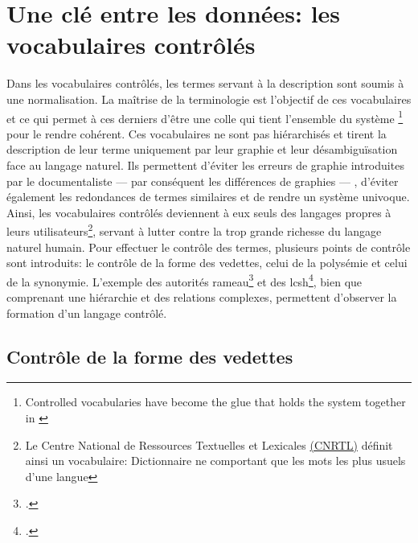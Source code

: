 \section{\label{I-A-2}Une clé entre les données: les vocabulaires contrôlés}

Dans les vocabulaires contrôlés, les termes servant à la description sont soumis à une normalisation. La maîtrise de la terminologie est l'objectif de ces vocabulaires et ce qui permet à ces derniers d'être une \og colle qui tient l'ensemble du système \footnote{\og Controlled vocabularies have become the glue that holds the system together \fg{} in \cite{rosenfeld_information_2015}}\fg{} pour le rendre cohérent. Ces vocabulaires ne sont pas hiérarchisés et tirent la description de leur terme uniquement par leur graphie et leur désambiguïsation face au langage naturel. Ils permettent d'éviter les erreurs de graphie introduites par le documentaliste --- par conséquent les différences de graphies --- , d'éviter également les redondances de termes similaires et de rendre un système univoque.
Ainsi, les vocabulaires contrôlés deviennent à eux seuls des langages propres à leurs utilisateurs\footnote{Le Centre National de Ressources Textuelles et Lexicales \href{https://www.cnrtl.fr/definition/vocabulaire}{(CNRTL)} définit ainsi un vocabulaire: \og Dictionnaire ne comportant que les mots les plus usuels d'une langue\fg{}}, servant à lutter contre la trop grande richesse du langage naturel humain.
Pour effectuer le contrôle des termes, plusieurs points de contrôle sont introduits: le contrôle de la forme des vedettes, celui de la polysémie et celui de la synonymie. L'exemple des autorités \ac{rameau}\footcite{bibliotheque_nationale_de_france_rameau_nodate} et des \ac{lcsh}\footcite{the_library_of_congress_library_nodate}, bien que comprenant une hiérarchie et des relations complexes, permettent d'observer la formation d'un langage contrôlé.

\subsection{\label{I-A-2-a}Contrôle de la forme des vedettes}

